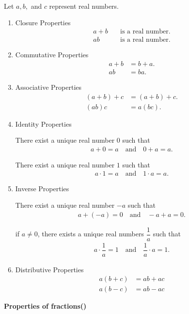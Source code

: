\documentclass{rmutt-seminar}
\begin{document}
\indent Let $a, b,$ and $c$ represent real numbers.
\begin{enumerate}
\item Closure Properties
\begin{align*}
a+b \quad &\text{is a real number.}\\
ab \quad &\text{is a real number.}
\end{align*}
\item Commutative Properties
\begin{align*}
a+b &= b+ a.\\
	ab &= ba.
\end{align*}

\item Associative Properties
\begin{align*}
	( a + b ) + c &= ( a + b ) + c. \\
	(ab)c &= a(bc).
\end{align*}

\item Identity Properties

There exist a unique real number $0$ such that
\begin{align*}
	 a + 0 = a \quad \text{and} \quad 0 + a = a.
\end{align*}

There exist a unique real number $1$ such that
\begin{align*}
	 a \cdot 1 = a \quad \text{and} \quad 1 \cdot a = a.
\end{align*}

\item Inverse Properties

There exist a unique real number $-a$ such that
\begin{align*}
	 a + (-a) = 0 \quad \text{and} \quad -a + a = 0.
\end{align*}

if $a \neq 0$, there exists a  unique real numbers $\dfrac{1}{a}$ such that
\begin{align*}
	 a \cdot \dfrac{1}{a} = 1 \quad \text{and} \quad \dfrac{1}{a} \cdot a = 1.
\end{align*}

\item Distributive Properties
\begin{align*}
	a(b+c) &= ab + ac\\
	a(b-c) &= ab - ac
\end{align*}
\end{enumerate}
\noindent\textbf{Properties of fractions(\cite{ARE08})}
\newline
\end{document}
